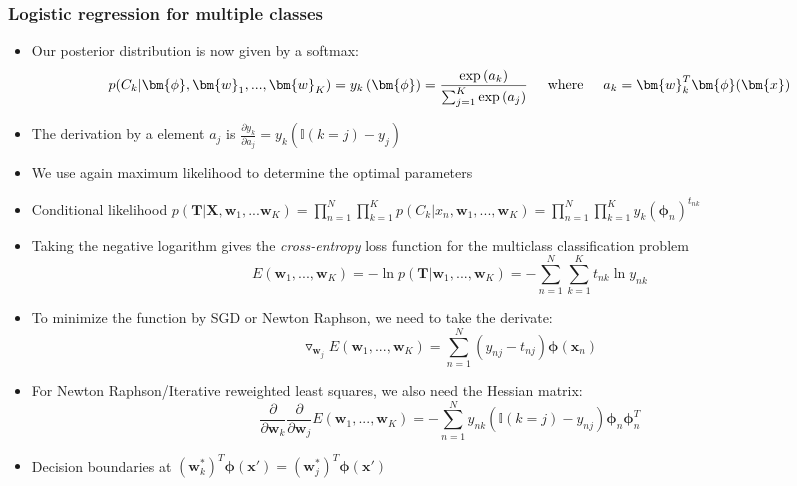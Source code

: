 \subsubsection{Logistic regression for multiple classes}
\begin{itemize}
	\item Our posterior distribution is now given by a softmax:
	$$p(C_k|\bm{\phi}, \bm{w}_1, ..., \bm{w}_K) = y_k\left(\bm{\phi}\right) = \frac{\exp\left(a_k\right)}{\sum_{j=1}^{K}\exp\left(a_j\right)} \text{\hspace{5mm}where\hspace{5mm}} a_k=\bm{w}_k^T\bm{\phi}(\bm{x})$$
	\item The derivation by a element $a_j$ is $\frac{\partial y_k}{\partial a_j}=y_k\left(\mathbb{I}\left(k=j\right) - y_j\right)$
	\item We use again maximum likelihood to determine the optimal parameters
	\item Conditional likelihood $p\left(\bm{T}|\bm{X},\bm{w}_1,...\bm{w}_K\right) = \prod\limits_{n=1}^{N}\prod\limits_{k=1}^{K}p(C_k|x_n, \bm{w}_1, ..., \bm{w}_K) = \prod\limits_{n=1}^{N}\prod\limits_{k=1}^{K} y_{k}\left(\bm{\phi}_n\right)^{t_{nk}}$
	\item Taking the negative logarithm gives the \textit{cross-entropy} loss function for the multiclass classification problem
	$$E\left(\bm{w}_1,...,\bm{w}_K\right) = - \ln p\left(\bm{T}|\bm{w}_1,...,\bm{w}_K\right) = -\sum\limits_{n=1}^{N}\sum\limits_{k=1}^{K} t_{nk} \ln y_{nk}$$
	\item To minimize the function by SGD or Newton Raphson, we need to take the derivate:
	$$\triangledown_{\bm{w}_j} E\left(\bm{w}_1, ...,\bm{w}_K\right) = \sum\limits_{n=1}^{N}\left(y_{nj} - t_{nj}\right) \bm{\phi}\left(\bm{x}_n\right)$$
	\item For Newton Raphson/Iterative reweighted least squares, we also need the Hessian matrix:
	$$\frac{\partial}{\partial \bm{w}_k}\frac{\partial}{\partial \bm{w}_j}E\left(\bm{w}_1,...,\bm{w}_K\right) = - \sum\limits_{n=1}^{N} y_{nk}\left(\mathbb{I}\left(k=j\right) - y_{nj}\right) \bm{\phi}_n \bm{\phi}_n^T$$
	\item Decision boundaries at $\left(\bm{w}_k^*\right)^T \bm{\phi}\left(\bm{x}'\right) = \left(\bm{w}_j^*\right)^T \bm{\phi}\left(\bm{x}'\right)$
\end{itemize}